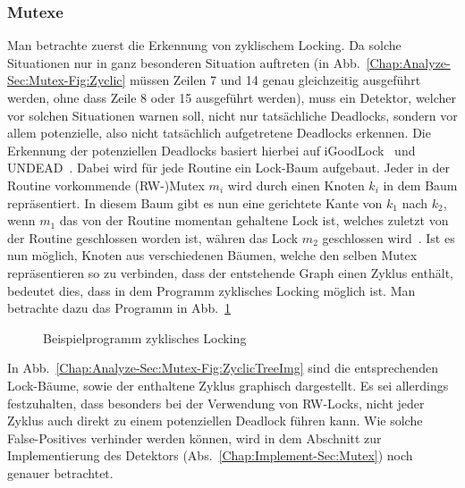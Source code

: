\subsubsection{Mutexe}
Man betrachte zuerst die Erkennung von zyklischem Locking. 
Da solche Situationen nur in ganz besonderen Situation auftreten 
(in Abb.~\ref{Chap:Analyze-Sec:Mutex-Fig:Zyclic} müssen Zeilen 
7 und 14 genau gleichzeitig ausgeführt werden, ohne dass Zeile 8 oder 15 ausgeführt werden), muss 
ein Detektor, welcher vor solchen Situationen warnen soll, nicht nur tatsächliche Deadlocks, sondern
vor allem potenzielle, also nicht tatsächlich aufgetretene Deadlocks erkennen. Die Erkennung der 
potenziellen Deadlocks basiert hierbei auf iGoodLock~\cite{iGoodLock} und UNDEAD~\cite{Undead}. 
Dabei wird für jede Routine ein Lock-Baum aufgebaut. Jeder in der Routine vorkommende 
(RW-)Mutex $m_i$ wird durch einen Knoten $k_i$ in dem Baum repräsentiert. 
In diesem Baum gibt es nun eine gerichtete Kante von $k_1$ nach $k_2$, wenn 
$m_1$ das
von der Routine momentan gehaltene Lock ist, welches zuletzt von der Routine 
geschlossen worden ist, währen das Lock $m_2$ geschlossen wird~\cite{lock-tree}.
Ist es nun möglich, Knoten aus verschiedenen Bäumen, welche den selben
Mutex repräsentieren so zu verbinden, dass der entstehende Graph einen Zyklus 
enthält, bedeutet dies, dass in dem Programm zyklisches Locking möglich ist. 
Man betrachte dazu das Programm in Abb.~\ref{Chap:Analyze-Sec:Mutex-Fig:ZyclicTreeCode}
\begin{figure}[h!]
  
  \caption{Beispielprogramm zyklisches Locking}
  \label{Chap:Analyze-Sec:Mutex-Fig:ZyclicTreeCode}
\end{figure}
In Abb.~\ref{Chap:Analyze-Sec:Mutex-Fig:ZyclicTreeImg} sind die entsprechenden
Lock-Bäume, sowie der enthaltene Zyklus graphisch dargestellt. Es sei allerdings 
festzuhalten, dass besonders bei der Verwendung von RW-Locks, nicht jeder 
Zyklus auch direkt zu einem potenziellen Deadlock führen kann. Wie solche 
False-Positives verhinder werden können, wird in dem Abschnitt zur Implementierung
des Detektors (Abs.~\ref{Chap:Implement-Sec:Mutex}) noch genauer betrachtet.

